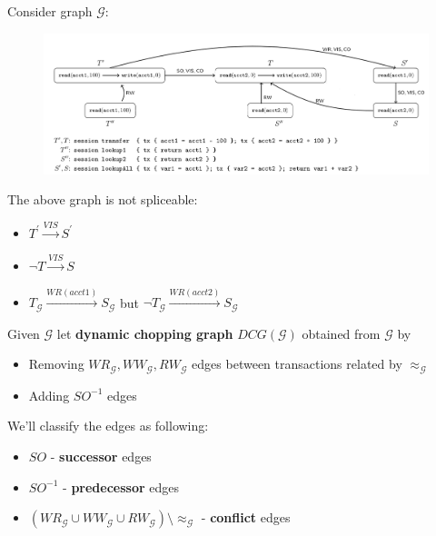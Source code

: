 \documentclass{beamer}
\begin{document}
\begin{frame}
	Consider graph $\mathcal{G}$:
	\begin{figure}
		\includegraphics[scale=0.28]{fig4}
	\end{figure}
	\begin{example}
		The above graph is not spliceable:
		\begin{itemize}
			\item $T^\prime \xrightarrow{VIS} S^\prime$
			\item $\neg T \xrightarrow{VIS} S$
			\item $\boxed{T}_\mathcal{G} \xrightarrow{WR(acct1)} \boxed{S}_\mathcal{G}$ but $\neg \boxed{T}_\mathcal{G} \xrightarrow{WR(acct2)} \boxed{S}_\mathcal{G}$
		\end{itemize}
	\end{example}
\end{frame}

\begin{frame}
	\begin{definition}
		Given $\mathcal{G}$ let \textbf{dynamic chopping graph} $DCG(\mathcal{G})$ obtained from $\mathcal{G}$ by
		\begin{itemize}
			\item Removing $WR_\mathcal{G}, WW_\mathcal{G}, RW_\mathcal{G}$ edges between transactions related by $\approx_\mathcal{G}$
			\item Adding $SO^{-1}$ edges
		\end{itemize}
		We'll classify the edges as following:
		\begin{itemize}
			\item $SO$ - \textbf{successor} edges
			\item $SO^{-1}$ - \textbf{predecessor} edges
			\item $\left( WR_\mathcal{G} \cup WW_\mathcal{G} \cup RW_\mathcal{G} \right) \setminus \approx_\mathcal{G}$ - \textbf{conflict} edges
		\end{itemize}
	\end{definition}
\end{frame}
\end{document}
